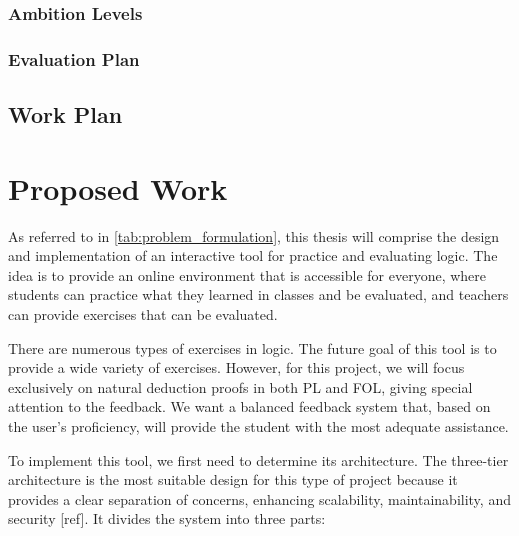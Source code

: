 \subsection{Ambition Levels}
\subsection{Evaluation Plan}


\section{Work Plan}






\chapter{Proposed Work}
As referred to in \ref{tab:problem_formulation}, this thesis will comprise the design and implementation of an interactive tool for practice and evaluating logic. The idea is to provide an online environment that is accessible for everyone, where students can practice what they learned in classes and be evaluated, and teachers can provide exercises that can be evaluated. 

There are numerous types of exercises in logic. The future goal of this tool is to provide a wide variety of exercises. However, for this project, we will focus exclusively on natural deduction proofs in both PL and FOL, giving special attention to the feedback. We want a balanced feedback system that, based on the user's proficiency, will provide the student with the most adequate assistance. 

To implement this tool, we first need to determine its architecture. The three-tier architecture is the most suitable design for this type of project because it provides a clear separation of concerns, enhancing scalability, maintainability, and security [ref]. It divides the system into three parts: 


